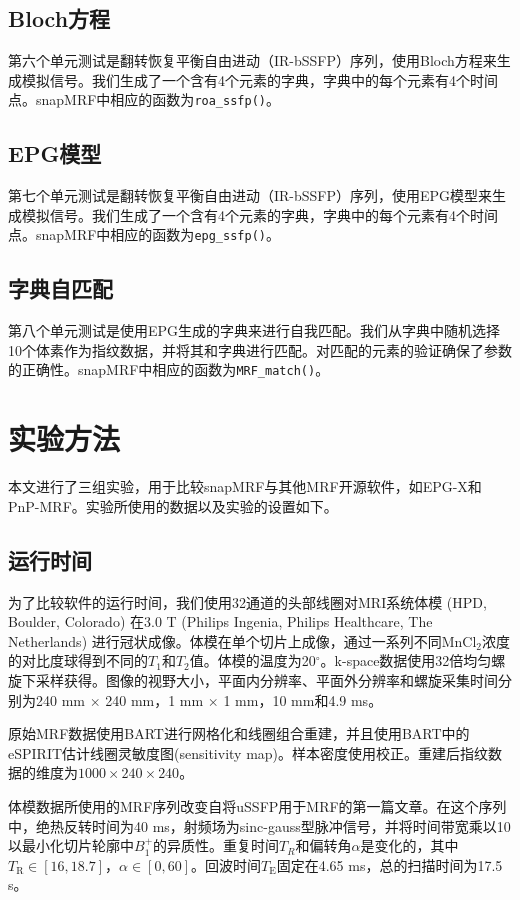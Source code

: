 \subsection{Bloch方程}
第六个单元测试是翻转恢复平衡自由进动（IR-bSSFP）序列，使用Bloch方程来生成模拟信号。我们生成了一个含有4个元素的字典，字典中的每个元素有4个时间点。snapMRF中相应的函数为\texttt{roa\_ssfp()}。

\subsection{EPG模型}
第七个单元测试是翻转恢复平衡自由进动（IR-bSSFP）序列，使用EPG模型来生成模拟信号。我们生成了一个含有4个元素的字典，字典中的每个元素有4个时间点。snapMRF中相应的函数为\texttt{epg\_ssfp()}。

\subsection{字典自匹配}
第八个单元测试是使用EPG生成的字典来进行自我匹配。我们从字典中随机选择10个体素作为指纹数据，并将其和字典进行匹配。对匹配的元素的验证确保了参数的正确性。snapMRF中相应的函数为\texttt{MRF\_match()}。

\section{实验方法}
本文进行了三组实验，用于比较snapMRF与其他MRF开源软件，如EPG-X和PnP-MRF。实验所使用的数据以及实验的设置如下。

\subsection{运行时间}
为了比较软件的运行时间，我们使用32通道的头部线圈对MRI系统体模 \cite{keenan_comparison_2016} (HPD, Boulder, Colorado) 在3.0 T (Philips Ingenia, Philips Healthcare, The Netherlands) 进行冠状成像。体模在单个切片上成像，通过一系列不同MnCl$_2$浓度的对比度球得到不同的$T_1$和$T_2$值。体模的温度为20$^{\circ}$。k-space数据使用32倍均匀螺旋下采样获得\cite{pipe_spiral_2014}。图像的视野大小，平面内分辨率、平面外分辨率和螺旋采集时间分别为240 mm $\times$ 240 mm，1 mm $\times$ 1 mm，10 mm和4.9 ms。

原始MRF数据使用BART\cite{bart}进行网格化和线圈组合重建，并且使用BART中的eSPIRIT估计线圈灵敏度图(sensitivity map)。样本密度使用\cite{zwart_sdc_2012}校正。重建后指纹数据的维度为$1000 \times 240 \times 240$。

体模数据所使用的MRF序列改变自将uSSFP用于MRF的第一篇文章\cite{jiang}。在这个序列中，绝热反转时间为40 ms，射频场为sinc-gauss型脉冲信号，并将时间带宽乘以10以最小化切片轮廓中$B_1^+$的异质性。重复时间$T_R$和偏转角$\alpha$是变化的，其中$T_\mathrm{R}\in [16,18.7]$，$\alpha \in [0,60]$。回波时间$T_\mathrm{E}$固定在4.65 ms，总的扫描时间为17.5 s。

